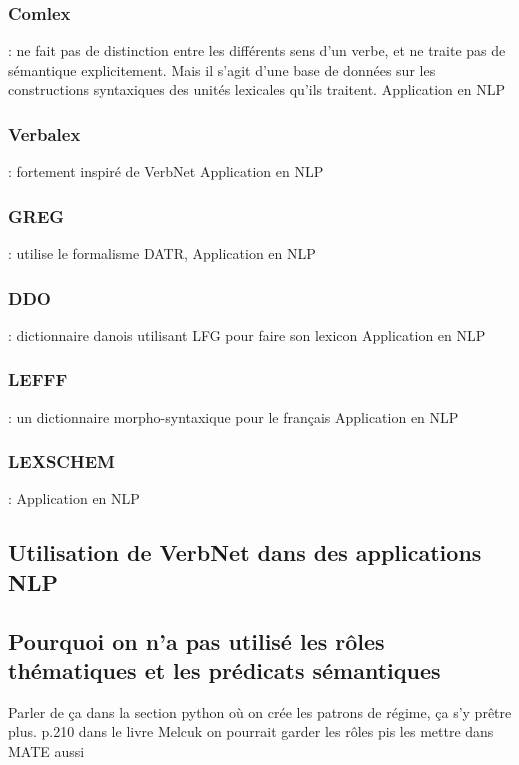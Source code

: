 \subsubsection{Comlex} : ne fait pas de distinction entre les différents sens d'un verbe, et ne traite pas de sémantique explicitement. Mais il s'agit d'une base de données sur les constructions syntaxiques des unités lexicales qu'ils traitent.
Application en NLP

\subsubsection{Verbalex} : fortement inspiré de VerbNet
Application en NLP

\subsubsection{GREG} : utilise le formalisme DATR, 
Application en NLP

\subsubsection{DDO} : dictionnaire danois utilisant LFG pour faire son lexicon
Application en NLP

\subsubsection{LEFFF} : un dictionnaire morpho-syntaxique pour le français
Application en NLP

\subsubsection{LEXSCHEM} :
Application en NLP


\subsection {Utilisation de VerbNet dans des applications NLP}




\subsection{Pourquoi on n'a pas utilisé les rôles thématiques et les prédicats sémantiques}

Parler de ça dans la section python où on crée les patrons de régime, ça s'y prêtre plus.
p.210 dans le livre Melcuk
on pourrait garder les rôles pis les mettre dans MATE aussi

